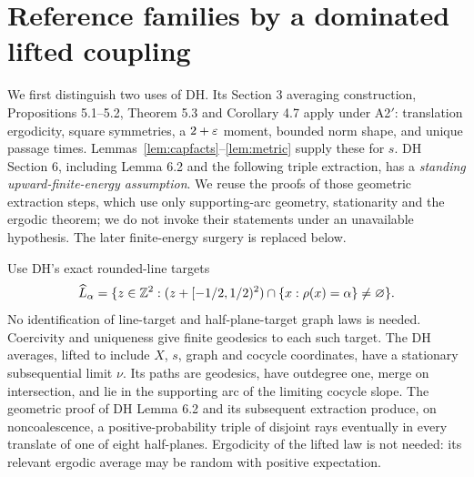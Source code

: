 \section{Reference families by a dominated lifted coupling}\label{sec:reference}
We first distinguish two uses of DH. Its Section 3 averaging construction,
Propositions 5.1--5.2, Theorem 5.3 and Corollary 4.7 apply under A2$'$:
translation ergodicity, square symmetries, a $2+\varepsilon$ moment, bounded norm
shape, and unique passage times. Lemmas~\ref{lem:capfacts}--\ref{lem:metric}
supply these for $s$. DH Section 6, including Lemma 6.2 and the following
triple extraction, has a \emph{standing upward-finite-energy assumption}.
We reuse the proofs of those geometric extraction steps, which use only
supporting-arc geometry, stationarity and the ergodic theorem; we do not
invoke their statements under an unavailable hypothesis. The later
finite-energy surgery is replaced below.

Use DH's exact rounded-line targets
\[
 \widehat L_\alpha=\{z\in\mathbb Z^2:(z+[-1/2,1/2)^2)
                  \cap\{x:\rho(x)=\alpha\}\ne\varnothing\}.
\]
No identification of line-target and half-plane-target graph laws is needed.
Coercivity and uniqueness give finite geodesics to each such target. The DH
averages, lifted to include $X$, $s$, graph and cocycle coordinates, have a
stationary subsequential limit $\nu$. Its paths are geodesics, have outdegree
one, merge on intersection, and lie in the supporting arc of the limiting
cocycle slope. The geometric proof of DH Lemma 6.2 and its subsequent
extraction produce, on noncoalescence, a positive-probability triple of
disjoint rays eventually in every translate of one of eight half-planes.
Ergodicity of the lifted law is not needed: its relevant ergodic average
may be random with positive expectation.

